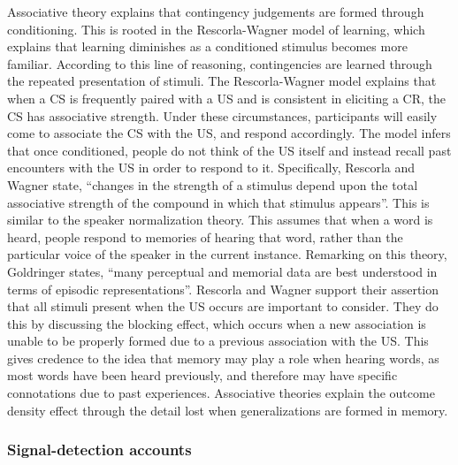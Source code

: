 \documentclass[
  english,
  man,floatsintext]{apa6}
\begin{document}
Associative theory explains that contingency judgements are formed through conditioning. This is rooted in the Rescorla-Wagner model of learning, which explains that learning diminishes as a conditioned stimulus becomes more familiar. According to this line of reasoning, contingencies are learned through the repeated presentation of stimuli. The Rescorla-Wagner model explains that when a CS is frequently paired with a US and is consistent in eliciting a CR, the CS has associative strength. Under these circumstances, participants will easily come to associate the CS with the US, and respond accordingly. The model infers that once conditioned, people do not think of the US itself and instead recall past encounters with the US in order to respond to it. Specifically, Rescorla and Wagner state, \enquote{changes in the strength of a stimulus depend upon the total associative strength of the compound in which that stimulus appears}. This is similar to the speaker normalization theory. This assumes that when a word is heard, people respond to memories of hearing that word, rather than the particular voice of the speaker in the current instance. Remarking on this theory, Goldringer states, \enquote{many perceptual and memorial data are best understood in terms of episodic representations}. Rescorla and Wagner support their assertion that all stimuli present when the US occurs are important to consider. They do this by discussing the blocking effect, which occurs when a new association is unable to be properly formed due to a previous association with the US. This gives credence to the idea that memory may play a role when hearing words, as most words have been heard previously, and therefore may have specific connotations due to past experiences. Associative theories explain the outcome density effect through the detail lost when generalizations are formed in memory.

\hypertarget{signal-detection-accounts}{%
\subsubsection{Signal-detection accounts}\label{signal-detection-accounts}}
\end{document}
